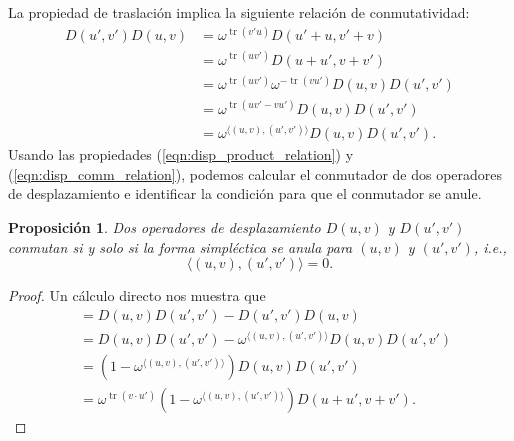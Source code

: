 \documentclass[a4paper]{report}
\DeclareMathOperator{\tr}{tr}
\newtheorem{proposition}{Proposición}
\begin{document}
  La propiedad de traslación implica la siguiente relación
  de conmutatividad:
  \begin{align}
    D(u',v')D(u,v)
    &= \omega^{\tr(v' u)} D(u'+u,v'+v) \\
    &= \omega^{\tr(u v')} D(u+u',v+v') \\
    &= \omega^{\tr(u v')} \omega^{-\tr(v u')}
    D(u,v)D(u',v') \\
    &= \omega^{\tr(u v' - v u')} D(u,v)D(u',v')
    \\
    &= \omega^{\langle (u,v), (u',v') \rangle}
    D(u,v)D(u',v') \label{eqn:disp_comm_relation}.
  \end{align}
  Usando las propiedades (\ref{eqn:disp_product_relation}) y
  (\ref{eqn:disp_comm_relation}), podemos calcular el
  conmutador de dos operadores de desplazamiento e
  identificar la condición para que el conmutador se anule.
  \begin{proposition}
    Dos operadores de desplazamiento $D(u,v)$ y $D(u',v')$
    conmutan si y solo si la forma simpléctica se anula para
    $(u,v)$ y $(u',v')$, i.e.,
    \begin{equation}
      \label{eqn:disp_comm_condition}
      \langle (u,v), (u',v') \rangle = 0.
    \end{equation}
  \end{proposition}
  \begin{proof}
    Un cálculo directo nos muestra que
    \begin{align}
      [D(u,v),D(u',v')]
      &= D(u,v)D(u',v') - D(u',v')D(u,v) \\
      &= D(u,v)D(u',v') - \omega^{\langle (u,v),(u',v')
      \rangle} D(u,v) D(u',v') \\
      &= \left( 1 - \omega^{\langle (u,v),(u',v') \rangle}
      \right) D(u,v)D(u',v') \\
      &= \omega^{\tr(v \cdot u')} \left( 1 - \omega^{\langle
      (u,v),(u',v') \rangle} \right) D(u+u',v+v').
      \label{eqn:disp_comm}
    \end{align}
  \end{proof}
    
\end{document}
